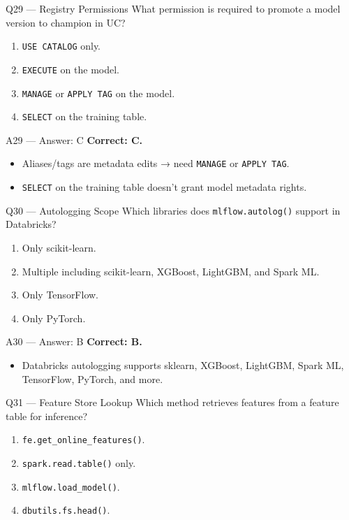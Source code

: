 \documentclass[aspectratio=169,10pt]{beamer}
\begin{document}
	\begin{frame}{Q29 — Registry Permissions}
		What permission is required to promote a model version to champion in UC?
		\begin{enumerate}[label=\Alph*.]
			\item \texttt{USE CATALOG} only.
			\item \texttt{EXECUTE} on the model.
			\item \texttt{MANAGE} or \texttt{APPLY TAG} on the model.
			\item \texttt{SELECT} on the training table.
		\end{enumerate}
	\end{frame}
	
	\begin{frame}{A29 — Answer: C}
		\textbf{Correct: C.}
		\begin{itemize}
			\item Aliases/tags are metadata edits → need \texttt{MANAGE} or \texttt{APPLY TAG}.
			\item \texttt{SELECT} on the training table doesn't grant model metadata rights.
		\end{itemize}
	\end{frame}
	
	\begin{frame}{Q30 — Autologging Scope}
		Which libraries does \texttt{mlflow.autolog()} support in Databricks?
		\begin{enumerate}[label=\Alph*.]
			\item Only scikit-learn.
			\item Multiple including scikit-learn, XGBoost, LightGBM, and Spark ML.
			\item Only TensorFlow.
			\item Only PyTorch.
		\end{enumerate}
	\end{frame}
	
	\begin{frame}{A30 — Answer: B}
		\textbf{Correct: B.}
		\begin{itemize}
			\item Databricks autologging supports sklearn, XGBoost, LightGBM, Spark ML, TensorFlow, PyTorch, and more.
		\end{itemize}
	\end{frame}
	
	\begin{frame}{Q31 — Feature Store Lookup}
		Which method retrieves features from a feature table for inference?
		\begin{enumerate}[label=\Alph*.]
			\item \texttt{fe.get\_online\_features()}.
			\item \texttt{spark.read.table()} only.
			\item \texttt{mlflow.load\_model()}.
			\item \texttt{dbutils.fs.head()}.
		\end{enumerate}
	\end{frame}
	
\end{document}
